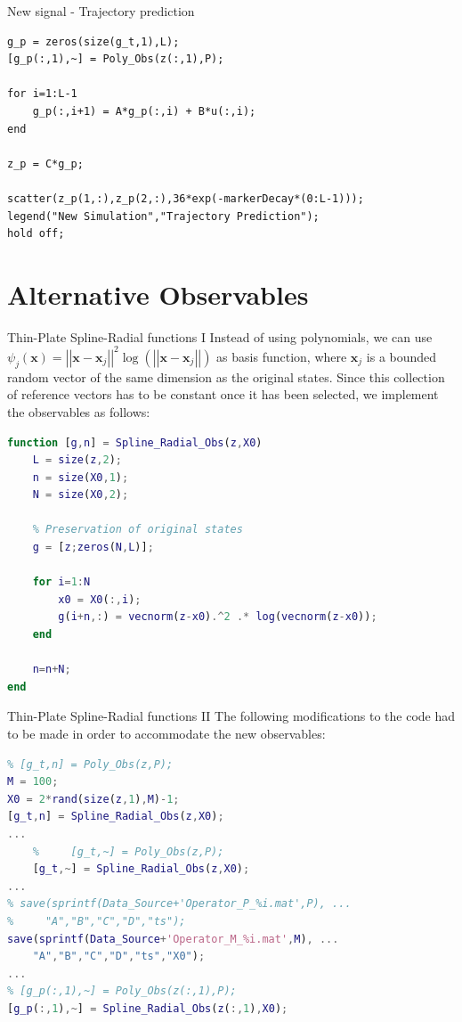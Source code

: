 \documentclass{beamer}
\begin{document}
\begin{frame}[fragile]{New signal - Trajectory prediction}
    \begin{lstlisting}
g_p = zeros(size(g_t,1),L);
[g_p(:,1),~] = Poly_Obs(z(:,1),P);

for i=1:L-1
    g_p(:,i+1) = A*g_p(:,i) + B*u(:,i);
end

z_p = C*g_p;

scatter(z_p(1,:),z_p(2,:),36*exp(-markerDecay*(0:L-1)));
legend("New Simulation","Trajectory Prediction");
hold off;
    \end{lstlisting}
\end{frame}


\section{Alternative Observables}

\begin{frame}[fragile]{Thin-Plate Spline-Radial functions I}
    Instead of using polynomials, we can use $\psi_j \left(\mathbf{x}\right) = \left|\left|\mathbf{x}-\mathbf{x}_j\right|\right|^2 \log{\left(\left|\left|\mathbf{x}-\mathbf{x}_j\right|\right|\right)}$ as basis function, where $\mathbf{x}_j$ is a bounded random vector of the same dimension as the original states. Since this collection of reference vectors has to be constant once it has been selected, we implement the observables as follows:

    \begin{lstlisting}[language=Matlab,basicstyle=\tiny]
function [g,n] = Spline_Radial_Obs(z,X0)
    L = size(z,2);
    n = size(X0,1);
    N = size(X0,2);
    
    % Preservation of original states
    g = [z;zeros(N,L)];

    for i=1:N
        x0 = X0(:,i);
        g(i+n,:) = vecnorm(z-x0).^2 .* log(vecnorm(z-x0));
    end

    n=n+N;
end
    \end{lstlisting}
\end{frame}

\begin{frame}[fragile]{Thin-Plate Spline-Radial functions II}
    The following modifications to the code had to be made in order to accommodate the new observables:

    \begin{lstlisting}[language=Matlab,basicstyle=\tiny]
% P = 12;
% [g_t,n] = Poly_Obs(z,P);
M = 100;
X0 = 2*rand(size(z,1),M)-1;
[g_t,n] = Spline_Radial_Obs(z,X0);
...
    %     [g_t,~] = Poly_Obs(z,P);
    [g_t,~] = Spline_Radial_Obs(z,X0);
...
% save(sprintf(Data_Source+'Operator_P_%i.mat',P), ...
%     "A","B","C","D","ts");
save(sprintf(Data_Source+'Operator_M_%i.mat',M), ...
    "A","B","C","D","ts","X0");
...
% [g_p(:,1),~] = Poly_Obs(z(:,1),P);
[g_p(:,1),~] = Spline_Radial_Obs(z(:,1),X0);
    \end{lstlisting}
\end{frame}
\end{document}
